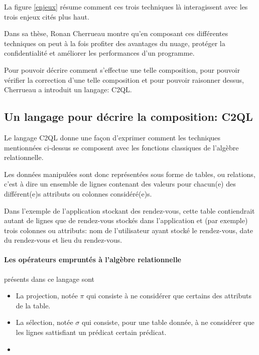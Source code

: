 La figure \ref{enjeux} résume comment ces trois techniques
là interagissent avec les trois enjeux cités plus haut.

Dans sa thèse, Ronan Cherrueau montre qu'en composant ces différentes techniques
on peut à la fois profiter des avantages du nuage, protéger la confidentialité
et améliorer les performances d'un programme.

Pour pouvoir décrire comment s'effectue une telle composition,
pour pouvoir vérifier la correction d'une telle composition et
pour pouvoir raisonner dessus, Cherrueau a introduit un langage: C2QL.

\subsection{Un langage pour décrire la composition: C2QL}
Le langage C2QL donne une façon d'exprimer comment les techniques
mentionnées ci-dessus se composent avec les fonctions classiques de l'algèbre relationnelle.

Les données manipulées sont donc représentées sous forme de tables, ou relations,
c'est à dire un ensemble de lignes contenant des valeurs pour chacun(e) des 
différent(e)s attributs ou colonnes considéré(e)s.

Dans l'exemple de l'application stockant des rendez-vous, cette
table contiendrait autant de lignes que de rendez-vous stockés 
dans l'application et (par exemple) trois colonnes ou attributs: 
nom de l'utilisateur
ayant stocké le rendez-vous, date du rendez-vous et lieu du rendez-vous.

\paragraph{Les opérateurs empruntés à l'algèbre relationnelle}
présents dans ce langage sont
\begin{itemize}
	\item La projection, notée $\pi$
	qui consiste à ne considérer que certains des attributs de la table.
	\item La sélection, notée $\sigma$
	qui consiste, pour une table donnée, à ne considérer que
	les lignes sattisfiant un prédicat certain prédicat.
	\item 
\end{itemize}
